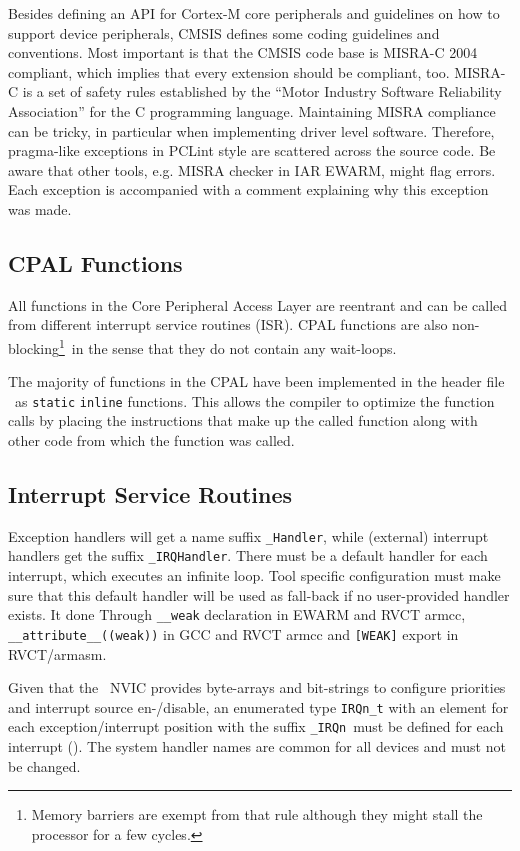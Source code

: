Besides defining an API for Cortex-M core peripherals and guidelines on how to
support device peripherals, CMSIS defines some coding guidelines and
conventions. Most important is that the CMSIS code base is MISRA-C 2004
compliant, which implies that every extension should be compliant, too. MISRA-C
is a set of safety rules established by the “Motor Industry Software Reliability
Association” for the C programming language. Maintaining MISRA compliance can be
tricky, in particular when implementing driver level software. Therefore,
pragma-like exceptions in PCLint style are scattered across the source code. Be
aware that other tools, e.g. MISRA checker in IAR EWARM, might flag errors. Each
exception is accompanied with a comment explaining why this exception was made.

\subsection{CPAL Functions}

All functions in the Core Peripheral Access Layer are reentrant and can be
called from different interrupt service routines (ISR). CPAL functions are also
non-blocking\footnote{Memory barriers are exempt from that rule although they
might stall the processor for a few cycles.}\ in the sense that they do not 
contain any wait-loops.

The majority of functions in the CPAL have been implemented in the header file
\ as \verb|static| \verb|inline| functions. This allows the
compiler to optimize the function calls by placing the instructions that make up the called
function along with other code from which the function was called.

\subsection{Interrupt Service Routines}

Exception handlers will get a name suffix \verb|_Handler|, while (external)
interrupt handlers get the suffix \verb|_IRQHandler|. There must be a default
handler for each interrupt, which executes an infinite loop.
Tool specific configuration must make sure that this default handler will be
used as fall-back if no user-provided handler exists. It done
Through \verb|__weak| declaration in EWARM and RVCT armcc,
\verb|__attribute__((weak))| in GCC and RVCT armcc and
\verb|[WEAK]| export in RVCT/armasm.

Given that the \cm{}\ NVIC provides byte-arrays and bit-strings to configure
priorities and interrupt source en-/disable, an enumerated type \verb|IRQn_t|
with an element for each exception/interrupt position with the suffix
\verb|_IRQn|\ must be defined for each interrupt (). The system
handler names are common for all devices and must not be changed.

